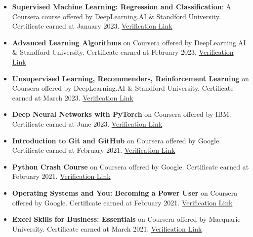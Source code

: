 \documentclass[letterpaper, 12pt]{article}
\begin{document}
\begin{itemize}[leftmargin=*]

	\item \textbf{Supervised Machine Learning: Regression and Classification}: A Coursera course offered by DeepLearning.AI \& Standford University. Certificate earned at January 2023. \href{https://www.coursera.org/account/accomplishments/certificate/VD8VT99H89J5}{Verification Link}

	\item \textbf{Advanced Learning Algorithms} on Coursera offered by DeepLearning.AI \&
	      Standford University. Certificate earned at February 2023.
	      \href{https://www.coursera.org/account/accomplishments/certificate/7PRNGGJZ7YBR}{Verification Link}

	\item \textbf{Unsupervised Learning, Recommenders, Reinforcement Learning} on
	      Coursera offered by DeepLearning.AI \& Standford University. Certificate earned at March 2023.
	      \href{https://www.coursera.org/account/accomplishments/certificate/CTH6L4SBUL7S}{Verification Link}

	\item \textbf{Deep Neural Networks with PyTorch} on Coursera offered by IBM.
	      Certificate earned at June 2023.
	      \href{https://www.coursera.org/account/accomplishments/certificate/VW9E3WQXYPJ9}{Verification Link}

	\item \textbf{Introduction to Git and GitHub} on Coursera offered by Google. Certificate earned at February 2021. \href{https://www.coursera.org/account/accomplishments/certificate/3H3N24N688CQ}{Verification Link}

	\item \textbf{Python Crash Course} on Coursera offered by Google. Certificate earned at February 2021. \href{https://www.coursera.org/account/accomplishments/certificate/ULTQVPQLDMZU}{Verification Link}

	\item \textbf{Operating Systems and You: Becoming a Power User} on Coursera offered by Google. Certificate earned at February 2021. \href{https://www.coursera.org/account/accomplishments/certificate/3N5CTQHU47X3}{Verification Link}

	\item \textbf{Excel Skills for Business: Essentials} on Coursera offered by Macquarie University. Certificate earned at March 2021. \href{https://www.coursera.org/account/accomplishments/certificate/7DPNK2A4CHMX}{Verification Link}

\end{itemize}
\end{document}
